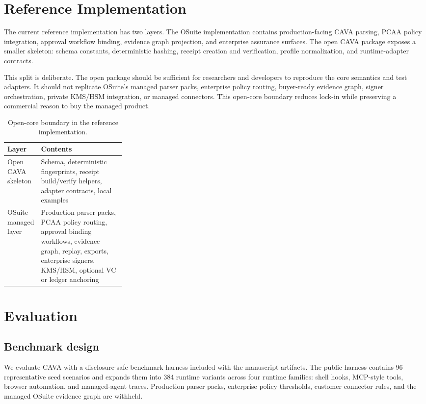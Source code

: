 \documentclass[11pt]{article}
\begin{document}
\section{Reference Implementation}

The current reference implementation has two layers. The OSuite implementation contains production-facing CAVA parsing, PCAA policy integration, approval workflow binding, evidence graph projection, and enterprise assurance surfaces. The open CAVA package exposes a smaller skeleton: schema constants, deterministic hashing, receipt creation and verification, profile normalization, and runtime-adapter contracts.

This split is deliberate. The open package should be sufficient for researchers and developers to reproduce the core semantics and test adapters. It should not replicate OSuite's managed parser packs, enterprise policy routing, buyer-ready evidence graph, signer orchestration, private KMS/HSM integration, or managed connectors. This open-core boundary reduces lock-in while preserving a commercial reason to buy the managed product.

\begin{table}[t]
\centering
\small
\caption{Open-core boundary in the reference implementation.}
\begin{tabularx}{\linewidth}{@{}>{\raggedright\arraybackslash}p{0.28\linewidth}X@{}}
\toprule
Layer & Contents \\
\midrule
Open CAVA skeleton & Schema, deterministic fingerprints, receipt build/verify helpers, adapter contracts, local examples \\
OSuite managed layer & Production parser packs, PCAA policy routing, approval binding workflows, evidence graph, replay, exports, enterprise signers, KMS/HSM, optional VC or ledger anchoring \\
\bottomrule
\end{tabularx}
\end{table}

\section{Evaluation}

\subsection{Benchmark design}

We evaluate CAVA with a disclosure-safe benchmark harness included with the manuscript artifacts. The public harness contains 96 representative seed scenarios and expands them into 384 runtime variants across four runtime families: shell hooks, MCP-style tools, browser automation, and managed-agent traces. Production parser packs, enterprise policy thresholds, customer connector rules, and the managed OSuite evidence graph are withheld.
\end{document}
